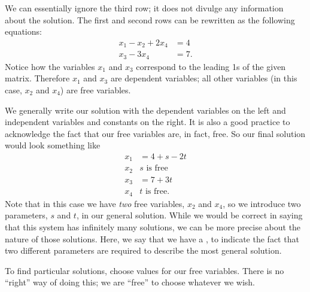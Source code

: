 {We can essentially ignore the third row; it does not divulge any information about the solution.
 The first and second rows can be rewritten as the following equations: 
\begin{align*} 
 x_1 - x_2 + 2x_4 &=4 \\
 x_3 - 3x_4 &= 7.
\end{align*} 
Notice how the variables $x_1$ and $x_3$ correspond to the leading 1s of the given matrix. Therefore $x_1$ and $x_3$ are dependent variables; all other variables (in this case, $x_2$ and $x_4$) are free variables.

We generally write our solution with the dependent variables on the left and independent variables and constants on the right. It is also a good practice to acknowledge the fact that our free variables are, in fact, free. So our final solution would look something like 
\begin{align*} 
 x_1 &= 4 + s - 2t \\ 
 x_2 & s \text{ is free} \\
 x_3 &= 7+3t \\ 
 x_4 & t \text{ is free}.
\end{align*}
Note that in this case we have \textit{two} free variables, $x_2$ and $x_4$, so we introduce two parameters, $s$ and $t$, in our general solution. While we would be correct in saying that this system has infinitely many solutions, we can be more precise about the nature of those solutions. Here, we say that we have a , to indicate the fact that two different parameters are required to describe the most general solution.


To find particular solutions, choose values for our free variables. There is no ``right'' way of doing this; we are ``free'' to choose whatever we wish. 

}
